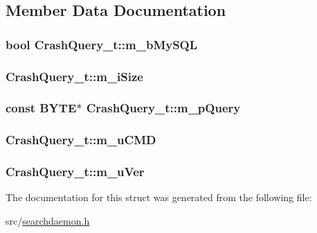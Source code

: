 \subsection{Member Data Documentation}
\hypertarget{structCrashQuery__t_a1f4809becd142590cb089634006c47f1}{
\subsubsection[{m\-\_\-b\-My\-S\-Q\-L}]{\setlength{\rightskip}{0pt plus 5cm}bool Crash\-Query\-\_\-t\-::m\-\_\-b\-My\-S\-Q\-L}}\label{structCrashQuery__t_a1f4809becd142590cb089634006c47f1}
\hypertarget{structCrashQuery__t_a80a0de48c5d5abdfa0d52ef68cec79c4}{
\subsubsection[{m\-\_\-i\-Size}]{ Crash\-Query\-\_\-t\-::m\-\_\-i\-Size}}\label{structCrashQuery__t_a80a0de48c5d5abdfa0d52ef68cec79c4}
\hypertarget{structCrashQuery__t_af12424bf2739ae7ccecf15295b9feac9}{
\subsubsection[{m\-\_\-p\-Query}]{\setlength{\rightskip}{0pt plus 5cm}const {\bf B\-Y\-T\-E}$\ast$ Crash\-Query\-\_\-t\-::m\-\_\-p\-Query}}\label{structCrashQuery__t_af12424bf2739ae7ccecf15295b9feac9}
\hypertarget{structCrashQuery__t_a4953d6b84d8e369d972934f88b85f036}{
\subsubsection[{m\-\_\-u\-C\-M\-D}]{ Crash\-Query\-\_\-t\-::m\-\_\-u\-C\-M\-D}}\label{structCrashQuery__t_a4953d6b84d8e369d972934f88b85f036}
\hypertarget{structCrashQuery__t_aa8289ca18a5bf8a161b1d4f88d419e2a}{
\subsubsection[{m\-\_\-u\-Ver}]{ Crash\-Query\-\_\-t\-::m\-\_\-u\-Ver}}\label{structCrashQuery__t_aa8289ca18a5bf8a161b1d4f88d419e2a}


The documentation for this struct was generated from the following file\-:\begin{DoxyCompactItemize}
\item 
src/\hyperlink{searchdaemon_8h}{searchdaemon.\-h}\end{DoxyCompactItemize}
